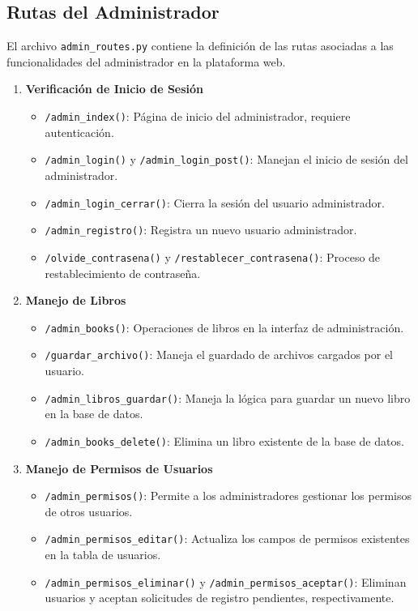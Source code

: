 \documentclass[a4paper, 12pt]{book}
\begin{document}
\subsection{Rutas del Administrador}
\label{sec:rutas_admin}

El archivo \texttt{admin\_routes.py} contiene la definición de las rutas asociadas a las funcionalidades del administrador en la plataforma web.

\begin{enumerate}
    \item \textbf{Verificación de Inicio de Sesión}
    \begin{itemize}
        \item \texttt{/admin\_index()}: Página de inicio del administrador, requiere autenticación.
        \item \texttt{/admin\_login()} y \texttt{/admin\_login\_post()}: Manejan el inicio de sesión del administrador.
        \item \texttt{/admin\_login\_cerrar()}: Cierra la sesión del usuario administrador.
        \item \texttt{/admin\_registro()}: Registra un nuevo usuario administrador.
        \item \texttt{/olvide\_contrasena()} y \texttt{/restablecer\_contrasena()}: Proceso de restablecimiento de contraseña.
    \end{itemize}

    \item \textbf{Manejo de Libros}
    \begin{itemize}
        \item \texttt{/admin\_books()}: Operaciones de libros en la interfaz de administración.
        \item \texttt{/guardar\_archivo()}: Maneja el guardado de archivos cargados por el usuario.
        \item \texttt{/admin\_libros\_guardar()}: Maneja la lógica para guardar un nuevo libro en la base de datos.
        \item \texttt{/admin\_books\_delete()}: Elimina un libro existente de la base de datos.
    \end{itemize}

    \item \textbf{Manejo de Permisos de Usuarios}
    \begin{itemize}
        \item \texttt{/admin\_permisos()}: Permite a los administradores gestionar los permisos de otros usuarios.
        \item \texttt{/admin\_permisos\_editar()}: Actualiza los campos de permisos existentes en la tabla de usuarios.
        \item \texttt{/admin\_permisos\_eliminar()} y \texttt{/admin\_permisos\_aceptar()}: Eliminan usuarios y aceptan solicitudes de registro pendientes, respectivamente.
    \end{itemize}


\end{enumerate}
\end{document}
